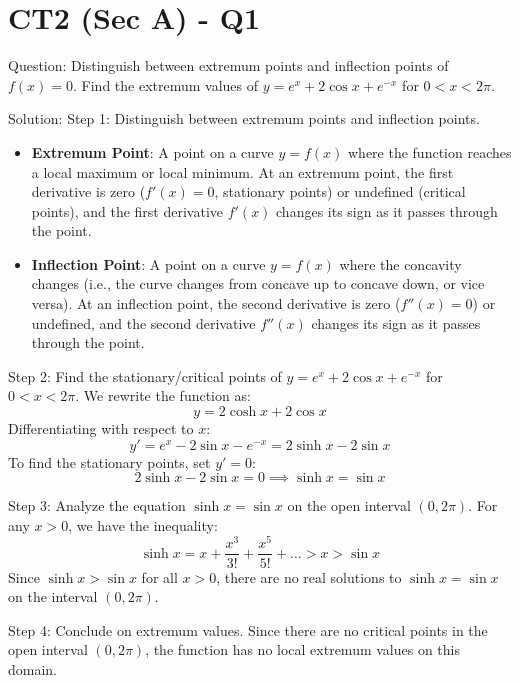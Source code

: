 \documentclass{article}
\begin{document}
\section*{CT2 (Sec A) - Q1}
Question:
Distinguish between extremum points and inflection points of $f(x)=0$. Find the extremum values of $y = e^x + 2\cos x + e^{-x}$ for $0 < x < 2\pi$.

Solution:
Step 1: Distinguish between extremum points and inflection points.
\begin{itemize}
    \item \textbf{Extremum Point}: A point on a curve $y = f(x)$ where the function reaches a local maximum or local minimum. At an extremum point, the first derivative is zero ($f'(x) = 0$, stationary points) or undefined (critical points), and the first derivative $f'(x)$ changes its sign as it passes through the point.
    \item \textbf{Inflection Point}: A point on a curve $y = f(x)$ where the concavity changes (i.e., the curve changes from concave up to concave down, or vice versa). At an inflection point, the second derivative is zero ($f''(x) = 0$) or undefined, and the second derivative $f''(x)$ changes its sign as it passes through the point.
\end{itemize}

Step 2: Find the stationary/critical points of $y = e^x + 2\cos x + e^{-x}$ for $0 < x < 2\pi$.
We rewrite the function as:
\[
y = 2\cosh x + 2\cos x
\]
Differentiating with respect to $x$:
\[
y' = e^x - 2\sin x - e^{-x} = 2\sinh x - 2\sin x
\]
To find the stationary points, set $y' = 0$:
\[
2\sinh x - 2\sin x = 0 \implies \sinh x = \sin x
\]

Step 3: Analyze the equation $\sinh x = \sin x$ on the open interval $(0, 2\pi)$.
For any $x > 0$, we have the inequality:
\[
\sinh x = x + \frac{x^3}{3!} + \frac{x^5}{5!} + \dots > x > \sin x
\]
Since $\sinh x > \sin x$ for all $x > 0$, there are no real solutions to $\sinh x = \sin x$ on the interval $(0, 2\pi)$.

Step 4: Conclude on extremum values.
Since there are no critical points in the open interval $(0, 2\pi)$, the function has no local extremum values on this domain.
\end{document}

